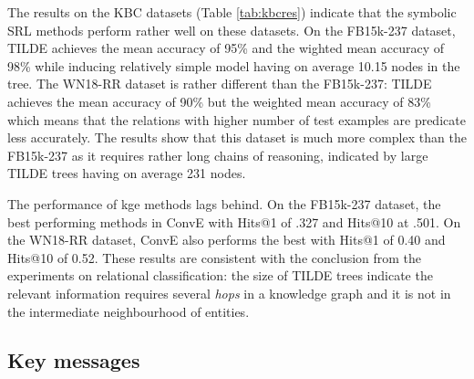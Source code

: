The results on the KBC datasets (Table \ref{tab:kbcres}) indicate that the symbolic SRL methods perform rather well on these datasets.
On the FB15k-237 dataset, TILDE achieves the mean accuracy of 95\% and the wighted mean accuracy of 98\% while inducing relatively simple model having on average 10.15 nodes in the tree.
The WN18-RR dataset is rather different than the FB15k-237: TILDE achieves the mean accuracy of 90\% but the weighted mean accuracy of 83\% which means that the relations with higher number of test examples are predicate less accurately.
The results show that this dataset is much more complex than the FB15k-237 as it requires rather long chains of reasoning, indicated by large TILDE trees having on average 231 nodes.


The performance of \gls{kge} methods lags behind.
On the FB15k-237 dataset, the best performing methods in ConvE with Hits@1 of .327 and Hits@10 at .501.
On the WN18-RR dataset, ConvE also performs the best with Hits@1 of 0.40 and Hits@10 of 0.52.
These results are consistent with the conclusion from the experiments on relational classification: the size of TILDE trees indicate the relevant information requires several \textit{hops} in a knowledge graph and it is not in the intermediate neighbourhood of entities.





\subsection{Key messages}


